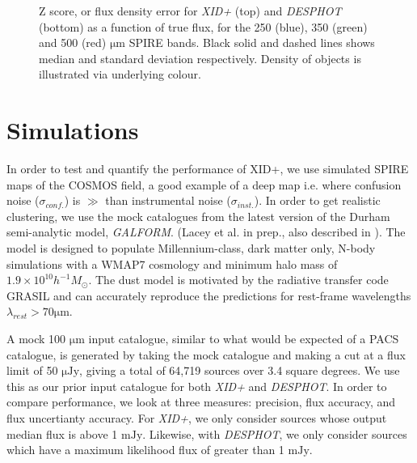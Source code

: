 \documentclass[useAMS,usenatbib]{mnras}
\begin{document}
\begin{figure}
\caption{Z score, or flux density error for \emph{XID+} (top) and \emph{DESPHOT} (bottom) as a function of true flux, for the 250 (blue), 350 (green) and 500 (red) $\mathrm{\mu m}$ SPIRE bands. Black solid and dashed lines shows median and standard deviation respectively. Density of objects is illustrated via underlying colour.}\label{fig:zscore}
\end{figure}

\section{Simulations}\label{sec:sims}
In order to test and quantify the performance of XID+, we use simulated SPIRE maps of the COSMOS field, a good example of a deep map i.e. where confusion noise ($\sigma_{conf.}$) is $\gg$ than instrumental noise ($\sigma_{inst.}$). In order to get realistic clustering, we use the mock catalogues from the latest version of the Durham semi-analytic model, \emph{GALFORM}. (Lacey et al. in prep., also described in \cite{Cowley:2014}). The model is designed to populate Millennium-class, dark matter only, N-body simulations with a WMAP7 cosmology and minimum halo mass of $1.9 \times 10^{10} h^{-1} M_{\odot}$. The dust model is motivated by the radiative transfer code GRASIL \citep{Silva:1998} and can accurately reproduce the predictions for rest-frame wavelengths $\lambda_{rest} > 70 \mathrm{\mu m}$.

A mock 100 $\mathrm{\mu m}$ input catalogue, similar to what would be expected of a PACS catalogue, is generated by taking the mock catalogue and making a cut at a flux limit of 50 $\mathrm{\mu Jy}$, giving a total of 64,719 sources over 3.4 square degrees. We use this as our prior input catalogue for both \emph{XID+} and \emph{DESPHOT}. In order to compare performance, we look at three measures: precision, flux accuracy, and flux uncertianty accuracy. For \emph{XID+}, we only consider sources whose output median flux is above 1 $\mathrm{mJy}$. Likewise, with \emph{DESPHOT}, we only consider sources which have a maximum likelihood flux of greater than 1 $\mathrm{mJy}$. 
\end{document}

